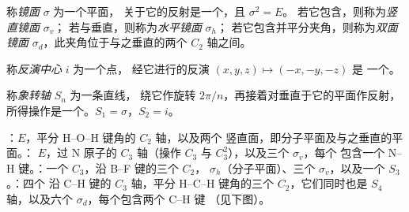 \begin{definition}[镜面]\label{def:b3:point-groups:mirror}
称\emph{镜面} $\sigma$ 为一个平面，
关于它的反射是一个，且 $\sigma^2 = E$。
若它包含，则称为\emph{竖直镜面} $\sigma_v$；
若与垂直，则称为\emph{水平镜面}
$\sigma_h$；
若它包含并平分夹角，则称为\emph{双面镜面}
$\sigma_d$，此夹角位于与之垂直的两个
$C_2$ 轴之间。
\end{definition}

\begin{definition}[反演中心]\label{def:b3:point-groups:inversion}
称\emph{反演中心} $i$ 为一个点，
经它进行的反演 $(x, y, z) \mapsto (-x, -y, -z)$ 是
一个。
\end{definition}

\begin{definition}[象转轴]\label{def:b3:point-groups:improper}
称\emph{象转轴} $S_n$ 为一条直线，
绕它作旋转 $2\pi/n$，再接着对垂直于它的平面作反射，
所得操作是一个。$S_1 = \sigma$，$S_2 = i$。
\end{definition}

\begin{example}[四种分子的对称元素]\label{ex:b3:point-groups:elements}
：$E$，平分 H--O--H 键角的 $C_2$ 轴，以及两个
竖直面，即分子平面及与之垂直的平面。：
$E$，过 N 原子的 $C_3$ 轴（操作 $C_3$ 与 $C_3^2$），以及三个 $\sigma_v$，每个
包含一个 N--H 键。：一个 $C_3$，沿 B--F 键的三个 $C_2$，
$\sigma_h$（分子平面）、三个 $\sigma_v$，以及一个 $S_3$。：四个
沿 C--H 键的 $C_3$ 轴，平分 H--C--H 键角的三个 $C_2$，它们同时也是
$S_4$ 轴，以及六个 $\sigma_d$，每个包含两个 C--H 键
（见下图）。
\end{example}

